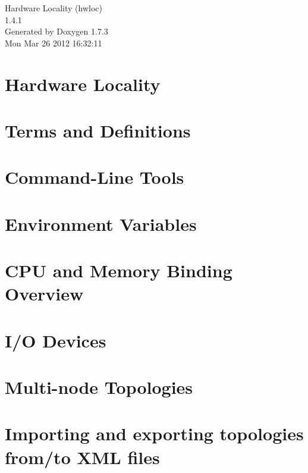 \documentclass[a4paper]{book}
\begin{document}
\hypersetup{pageanchor=false}
\begin{titlepage}
\vspace*{7cm}
\begin{center}
{\Large Hardware Locality (hwloc) \\[1ex]\large 1.4.1 }\\
\vspace*{1cm}
{\large Generated by Doxygen 1.7.3}\\
\vspace*{0.5cm}
{\small Mon Mar 26 2012 16:32:11}\\
\end{center}
\end{titlepage}
\clearemptydoublepage
{}
\tableofcontents
\clearemptydoublepage
{}
\hypersetup{pageanchor=true}
\chapter{Hardware Locality}
\label{index}\hypertarget{index}{}
\chapter{Terms and Definitions}
\label{termsanddefs}
\hypertarget{termsanddefs}{}

\chapter{Command-\/Line Tools}
\label{tools}
\hypertarget{tools}{}

\chapter{Environment Variables}
\label{envvar}
\hypertarget{envvar}{}

\chapter{CPU and Memory Binding Overview}
\label{cpu_mem_bind}
\hypertarget{cpu_mem_bind}{}

\chapter{I/O Devices}
\label{iodevices}
\hypertarget{iodevices}{}

\chapter{Multi-\/node Topologies}
\label{multinode}
\hypertarget{multinode}{}

\chapter{Importing and exporting topologies from/to XML files}
\label{xml}
\hypertarget{xml}{}

\end{document}
